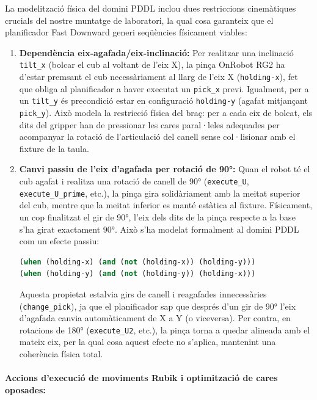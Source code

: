 \documentclass[12pt, a4paper]{article}
\begin{document}
La modelització física del domini PDDL inclou dues restriccions cinemàtiques crucials del nostre muntatge de laboratori, la qual cosa garanteix que el planificador Fast Downward generi seqüències físicament viables:

\begin{enumerate}[leftmargin=1.5em]
  \item \textbf{Dependència eix-agafada/eix-inclinació:} Per realitzar una inclinació \texttt{tilt\_x} (bolcar el cub al voltant de l'eix X), la pinça OnRobot RG2 ha d'estar premsant el cub necessàriament al llarg de l'eix X (\texttt{holding-x}), fet que obliga al planificador a haver executat un \texttt{pick\_x} previ. Igualment, per a un \texttt{tilt\_y} és precondició estar en configuració \texttt{holding-y} (agafat mitjançant \texttt{pick\_y}). Això modela la restricció física del braç: per a cada eix de bolcat, els dits del gripper han de pressionar les cares paral·leles adequades per acompanyar la rotació de l'articulació del canell sense col·lisionar amb el fixture de la taula.
  
  \item \textbf{Canvi passiu de l'eix d'agafada per rotació de 90°:} Quan el robot té el cub agafat i realitza una rotació de canell de 90° (\texttt{execute\_U}, \texttt{execute\_U\_prime}, etc.), la pinça gira solidàriament amb la meitat superior del cub, mentre que la meitat inferior es manté estàtica al fixture. Físicament, un cop finalitzat el gir de 90°, l'eix dels dits de la pinça respecte a la base s'ha girat exactament 90°. Això s'ha modelat formalment al domini PDDL com un efecte passiu:
  \begin{lstlisting}[language=Lisp, basicstyle=\ttfamily\scriptsize]
(when (holding-x) (and (not (holding-x)) (holding-y)))
(when (holding-y) (and (not (holding-y)) (holding-x)))
  \end{lstlisting}
  Aquesta propietat estalvia girs de canell i reagafades innecessàries (\texttt{change\_pick}), ja que el planificador sap que després d'un gir de 90° l'eix d'agafada canvia automàticament de X a Y (o viceversa). Per contra, en rotacions de 180° (\texttt{execute\_U2}, etc.), la pinça torna a quedar alineada amb el mateix eix, per la qual cosa aquest efecte no s'aplica, mantenint una coherència física total.
\end{enumerate}

\paragraph{Accions d'execució de moviments Rubik i optimització de cares oposades:}
\end{document}
